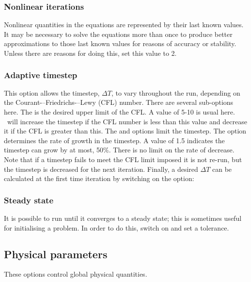 \subsubsection{Nonlinear iterations}
Nonlinear quantities in the equations are represented by their last known
values. It may be necessary to solve the equations more than once to produce
better approximations to those last known values for reasons of accuracy or
stability. Unless there are reasons for doing this, set this value to 2.

\subsubsection{Adaptive timestep}
\label{section:config_adaptive_timestep}
This option allows the timestep, $\Delta T$, to vary throughout the run, depending on the
Courant-–Friedrichs-–Lewy (CFL) number.  There are several sub-options here. The
 is the desired upper limit of the CFL. A value of 5-10 is usual
here. \fluidity\ will increase the timestep if the CFL number is less than this value and decrease
it if the CFL is greater than this. The  and
 options limit the timestep. The option
 determines
the rate of growth in the timestep. A value of 1.5 indicates the timestep can grow by
at most, 50\%. There is no limit on the rate of decrease. Note that if a timestep fails
to meet the CFL limit imposed it is not re-run, but the timestep is decreased for the next
iteration. Finally, a desired $\Delta T$ can be calculated at the first time iteration by
switching on the option: 

\subsubsection{Steady state}
It is possible to run \fluidity until it converges to a steady state; this is sometimes useful for initialising a problem. In order to do this, switch on  and set a tolerance.

\subsection{Physical parameters}
These options control global physical quantities.

